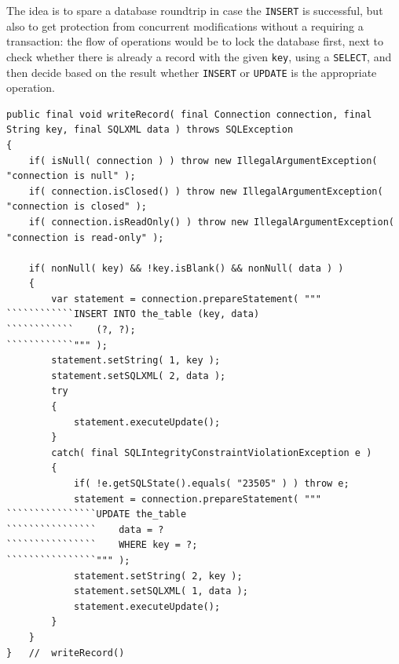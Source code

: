 The idea is to spare a database roundtrip in case the \texttt{INSERT} is successful, but also to get protection from concurrent modifications without a requiring a transaction: the  flow of operations would be to lock the database first, next to check whether there is already a record with the given \lstinline|key|, using a \texttt{SELECT},  and then decide based on the result whether \texttt{INSERT} or \texttt{UPDATE} is the appropriate operation.

\begin{lstlisting}
public final void writeRecord( final Connection connection, final String key, final SQLXML data ) throws SQLException
{
    if( isNull( connection ) ) throw new IllegalArgumentException( "connection is null" );
    if( connection.isClosed() ) throw new IllegalArgumentException( "connection is closed" );
    if( connection.isReadOnly() ) throw new IllegalArgumentException( "connection is read-only" );

    if( nonNull( key) && !key.isBlank() && nonNull( data ) )
    {
        var statement = connection.prepareStatement( """
````````````INSERT INTO the_table (key, data)
````````````    (?, ?);
````````````""" );
        statement.setString( 1, key );
        statement.setSQLXML( 2, data );
        try
        {
            statement.executeUpdate();
        }
        catch( final SQLIntegrityConstraintViolationException e )
        {
            if( !e.getSQLState().equals( "23505" ) ) throw e;
            statement = connection.prepareStatement( """
````````````````UPDATE the_table
````````````````    data = ?
````````````````    WHERE key = ?;
````````````````""" );
            statement.setString( 2, key );
            statement.setSQLXML( 1, data );
            statement.executeUpdate();
        }
    }
}   //  writeRecord()
\end{lstlisting}

